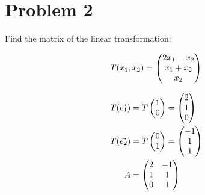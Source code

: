 \section*{Problem 2}

Find the matrix of the linear transformation:

\[
	T(x_1, x_2) = \genericmat{p}{2x_1 - x_2 \\ x_1 + x_2 \\ x_2}
\]

\[
	\begin{aligned}
		T(\vec{e_1}) &= T \genpmat{1\\0} = \genpmat{2\\1\\0} \\
		T(\vec{e_2}) &= T \genpmat{0\\1} = \genpmat{-1\\1\\1} \\
		A &= \genpmat{2&-1\\1&1\\0&1}
	\end{aligned}
\]
